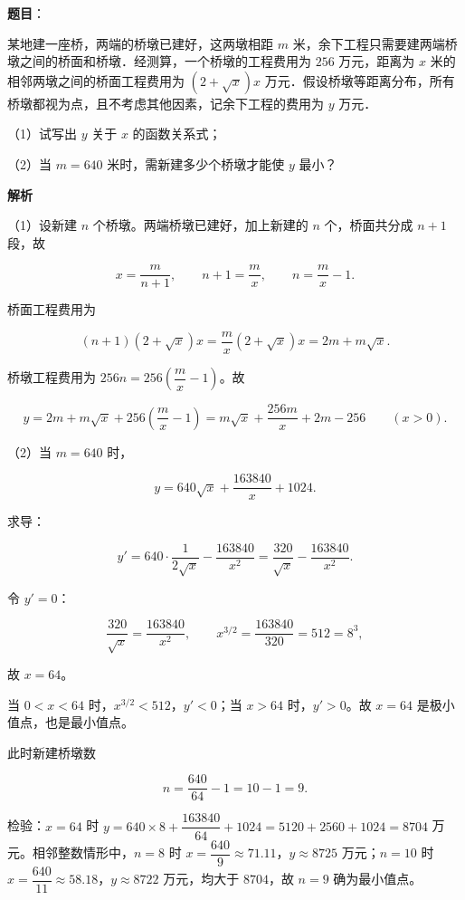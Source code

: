 \begin{answer}

\textbf{题目}：

某地建一座桥，两端的桥墩已建好，这两墩相距 $m$ 米，余下工程只需要建两端桥墩之间的桥面和桥墩．经测算，一个桥墩的工程费用为 $256$ 万元，距离为 $x$ 米的相邻两墩之间的桥面工程费用为 $(2+\sqrt x)x$ 万元．假设桥墩等距离分布，所有桥墩都视为点，且不考虑其他因素，记余下工程的费用为 $y$ 万元．

（1）试写出 $y$ 关于 $x$ 的函数关系式；

（2）当 $m=640$ 米时，需新建多少个桥墩才能使 $y$ 最小？

\textbf{解析}

（1）设新建 $n$ 个桥墩。两端桥墩已建好，加上新建的 $n$ 个，桥面共分成 $n+1$ 段，故

\nopagebreak[4]
\[x=\frac m{n+1},\qquad n+1=\frac mx,\qquad n=\frac mx-1.\]

桥面工程费用为

\nopagebreak[4]
\[(n+1)(2+\sqrt x)x=\frac mx(2+\sqrt x)x=2m+m\sqrt x.\]

桥墩工程费用为 $256n=256\left(\dfrac mx-1\right)$。故

\nopagebreak[4]
\[y=2m+m\sqrt x+256\left(\frac mx-1\right)
=m\sqrt x+\frac{256m}{x}+2m-256\qquad(x>0).\]

（2）当 $m=640$ 时，

\nopagebreak[4]
\[y=640\sqrt x+\frac{163840}{x}+1024.\]

求导：

\nopagebreak[4]
\[y'=640\cdot\frac1{2\sqrt x}-\frac{163840}{x^2}
=\frac{320}{\sqrt x}-\frac{163840}{x^2}.\]

令 $y'=0$：

\nopagebreak[4]
\[\frac{320}{\sqrt x}=\frac{163840}{x^2},\qquad x^{3/2}=\frac{163840}{320}=512=8^3,\]

故 $x=64$。

当 $0<x<64$ 时，$x^{3/2}<512$，$y'<0$；当 $x>64$ 时，$y'>0$。故 $x=64$ 是极小值点，也是最小值点。

此时新建桥墩数

\nopagebreak[4]
\[n=\frac{640}{64}-1=10-1=9.\]

检验：$x=64$ 时 $y=640\times8+\dfrac{163840}{64}+1024=5120+2560+1024=8704$ 万元。相邻整数情形中，$n=8$ 时 $x=\dfrac{640}9\approx71.11$，$y\approx8725$ 万元；$n=10$ 时 $x=\dfrac{640}{11}\approx58.18$，$y\approx8722$ 万元，均大于 $8704$，故 $n=9$ 确为最小值点。


\end{answer}
